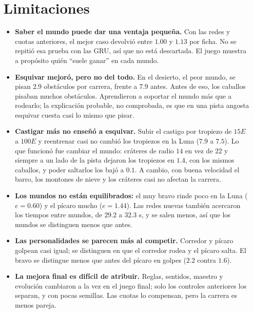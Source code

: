 \documentclass[11pt,letterpaper]{article}
\begin{document}
\section{Limitaciones}
\begin{itemize}
\item \textbf{Saber el mundo puede dar una ventaja pequeña.} Con las redes y cuotas anteriores, el mejor caso devolvió entre $1.00$ y $1.13$ por ficha. No se repitió esa prueba con las GRU, así que no está descartada. El juego muestra a propósito quién ``suele ganar'' en cada mundo.
\item \textbf{Esquivar mejoró, pero no del todo.} En el desierto, el peor mundo, se pisan $2.9$ obstáculos por carrera, frente a $7.9$ antes. Antes de eso, los caballos pisaban muchos obstáculos. Aprendieron a soportar el mundo más que a rodearlo; la explicación probable, no comprobada, es que en una pista angosta esquivar cuesta casi lo mismo que pisar.
\item \textbf{Castigar más no enseñó a esquivar.} Subir el castigo por tropiezo de $15E$ a $100E$ y reentrenar casi no cambió los tropiezos en la Luna ($7.9$ a $7.5$). Lo que funcionó fue cambiar el mundo: cráteres de radio $14$ en vez de $22$ y siempre a un lado de la pista dejaron los tropiezos en $1.4$, con los mismos caballos, y poder saltarlos los bajó a $0.1$. A cambio, con buena velocidad el barro, los montones de nieve y los cráteres casi no afectan la carrera.
\item \textbf{Los mundos no están equilibrados:} el muy bravo rinde poco en la Luna ($e = 0.60$) y el pícaro mucho ($e = 1.44$). Las redes nuevas también acercaron los tiempos entre mundos, de $29.2$ a $32.3$ s, y se salen menos, así que los mundos se distinguen menos que antes.
\item \textbf{Las personalidades se parecen más al competir.} Corredor y pícaro golpean casi igual; se distinguen en que el corredor rodea y el pícaro salta. El bravo se distingue menos que antes del pícaro en golpes ($2.2$ contra $1.6$).
\item \textbf{La mejora final es difícil de atribuir.} Reglas, sentidos, maestro y evolución cambiaron a la vez en el juego final; solo los controles anteriores los separan, y con pocas semillas. Las cuotas lo compensan, pero la carrera es menos pareja.

\end{itemize}
\end{document}
